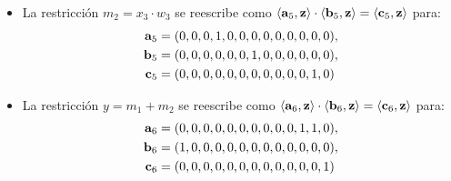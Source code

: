 \begin{itemize}
		\item La restricción $m_2 = x_3 \cdot w_3$ se reescribe como $\left\langle \mathbf{a}_5, \mathbf{z} \right\rangle \cdot \left\langle \mathbf{b}_5, \mathbf{z} \right\rangle = \left\langle \mathbf{c}_5, \mathbf{z} \right\rangle$ para:
	$$\begin{aligned}
		\mathbf{a}_5 &= (0, 0, 0, 1, 0, 0, 0, 0, 0, 0, 0, 0, 0), \\
		\mathbf{b}_5 &= (0, 0, 0, 0, 0, 0, 1, 0, 0, 0, 0, 0, 0), \\
		\mathbf{c}_5 &= (0, 0, 0, 0, 0, 0, 0, 0, 0, 0, 0, 1, 0)
	\end{aligned}$$
	\item La restricción $y = m_1 + m_2$ se reescribe como $\left\langle \mathbf{a}_6, \mathbf{z} \right\rangle \cdot \left\langle \mathbf{b}_6, \mathbf{z} \right\rangle = \left\langle \mathbf{c}_6, \mathbf{z} \right\rangle$ para:
	$$\begin{aligned}
		\mathbf{a}_6 &= (0, 0, 0, 0, 0, 0, 0, 0, 0, 0, 1, 1, 0), \\
		\mathbf{b}_6 &= (1, 0, 0, 0, 0, 0, 0, 0, 0, 0, 0, 0, 0), \\
		\mathbf{c}_6 &= (0, 0, 0, 0, 0, 0, 0, 0, 0, 0, 0, 0, 1)
	\end{aligned}$$
\end{itemize}

